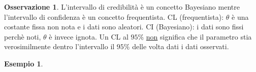 \documentclass[10pt]{article}
\theoremstyle{definition}
\newtheorem{example}{Esempio}[section]
\newtheorem{observation}{Osservazione}[subsection]
\begin{document}
    \begin{observation}
        L'intervallo di credibilità è un concetto Bayesiano mentre l'intervallo di
        confidenza è un concetto frequentista. CL (frequentista): \(\theta\) è una costante fissa
        non nota e i dati sono aleatori. CI (Bayesiano): i dati sono fissi perchè noti,
        \(\theta\) è invece ignota. Un CL al \(95\%\) \underline{non} significa che il
        parametro stia verosimilmente dentro l'intervallo il \(95\%\) delle volta dati
        i dati osservati.
    \end{observation}

    \begin{example}
        
    \end{example}
\end{document}

